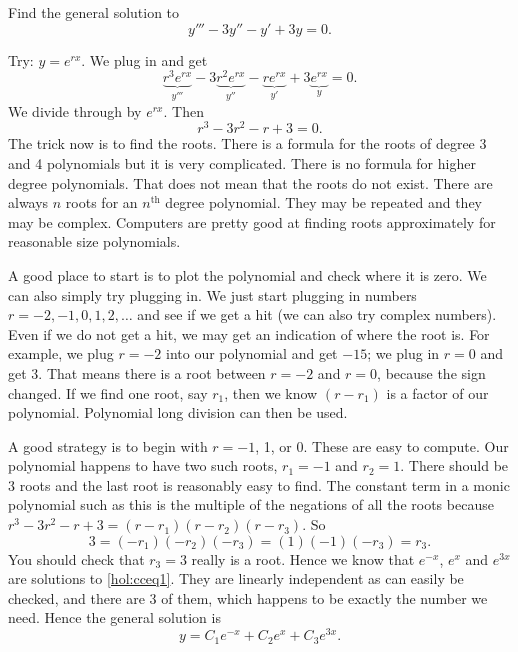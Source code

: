 \begin{example}
Find the general solution to
\begin{equation} \label{hol:cceq1}
y''' - 3 y'' - y' + 3y = 0 .
\end{equation}

Try: $y = e^{rx}$.  We plug in and get
\begin{equation*}
\underbrace{r^3 e^{rx}}_{y'''} - 3 \underbrace{r^2 e^{rx}}_{y''} -
\underbrace{r e^{rx}}_{y'} + 3 \underbrace{e^{rx}}_{y} = 0 .
\end{equation*}
We divide through by $e^{rx}$.  Then 
\begin{equation*}
r^3 - 3 r^2 - r + 3 = 0 .
\end{equation*}
The trick now is to find the roots.  There is a formula for the roots of
degree 3 and 4 polynomials but it is very complicated.  There is no formula
for higher degree polynomials.  That does not mean that the roots do not
exist.  There are always
$n$ roots for an $n^{\text{th}}$ degree polynomial.  They may be
repeated
and they may be complex.  Computers are pretty good at finding roots
approximately for reasonable size polynomials.

A good place to start is to plot the polynomial and check where it is zero.
We can also simply try plugging in.  We
just start plugging
in numbers $r=-2,-1,0,1,2,\ldots$ and see if we get a hit (we can also
try complex numbers).  Even
if we do not get a hit, we may get an indication
of where the root is.  For example, we plug
$r=-2$ into our polynomial and get $-15$; we plug in $r=0$ and get 3.
That means there is a root between $r=-2$ and $r=0$,
because the sign changed.
If we find one root, say $r_1$, then we know $(r-r_1)$ is a factor
of our polynomial.  Polynomial long division can then be used.

A good strategy is to begin with $r=-1$, 1, or 0.  These are
easy to compute.  Our polynomial happens to have
two such roots, $r_1 = -1$
and $r_2 = 1$.  There should be 3 roots and the last root is reasonably
easy to find.  The constant
term in a monic polynomial such as this is the multiple of the negations of all the roots
because $r^3 - 3 r^2 - r + 3 = (r-r_1)(r-r_2)(r-r_3)$.
So
\begin{equation*}
3 = (-r_1)(-r_2)(-r_3) = (1)(-1)(-r_3) = r_3 .
\end{equation*}
You should check that $r_3 = 3$ really
is a root.  Hence we know that $e^{-x}$, $e^{x}$
and $e^{3x}$ are solutions to \eqref{hol:cceq1}.  They are linearly independent
as can easily be checked, and there are 3 of them, which happens to be exactly
the number we need.  Hence the general solution is
\begin{equation*}
y = C_1 e^{-x} + C_2 e^{x} + C_3 e^{3x} .
\end{equation*}


\end{example}
